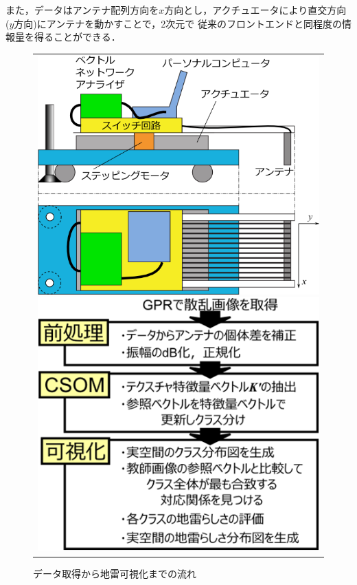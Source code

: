 ﻿\documentclass[a4j, 10pt]{jarticle}
\begin{document}
また，データはアンテナ配列方向を$x$方向とし，アクチュエータにより直交方向
($y$方向)にアンテナを動かすことで，2次元で
従来のフロントエンドと同程度の情報量を得ることができる．
\begin{figure}[hbtp]
 \begin{center}
  \begin{tabular}{c}
   \begin{minipage}{0.49\hsize}
\includegraphics[width =\hsize ]{so2.png}
\caption{1次元アレイアンテナ式地雷可視化システム}
\label{so2}
   \end{minipage}
   \begin{minipage}{0.5\hsize}
\includegraphics[width =\hsize ]{flowchart.png}
\caption{データ取得から地雷可視化までの流れ}
\label{flow}          
   \end{minipage}
  \end{tabular}
 \end{center}
\end{figure}
\end{document}
